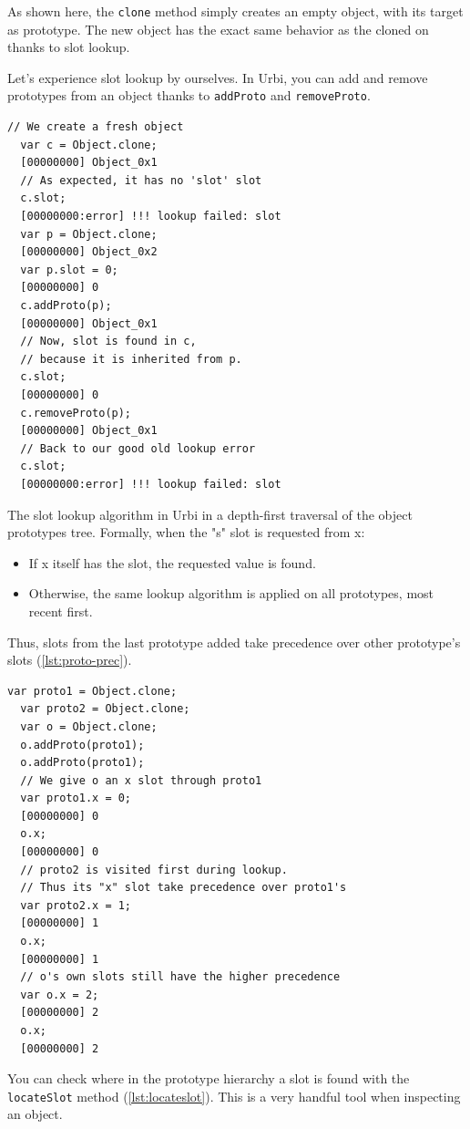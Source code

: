 \documentclass[openright,twoside,12pt]{report}
\newcommand{\urbi}{Urbi\xspace}
\newcommand{\lst}[1]{\autoref{lst:#1}}
\begin{document}
As shown here, the \texttt{clone} method simply creates an empty
object, with its target as prototype. The new object has the exact
same behavior as the cloned on thanks to slot lookup.

Let's experience slot lookup by ourselves. In \urbi, you can add and
remove prototypes from an object thanks to \texttt{addProto} and
\texttt{removeProto}.

\begin{lstlisting}[caption=Manipulating prototypes, label=lst:proto-change]
  // We create a fresh object
  var c = Object.clone;
  [00000000] Object_0x1
  // As expected, it has no 'slot' slot
  c.slot;
  [00000000:error] !!! lookup failed: slot
  var p = Object.clone;
  [00000000] Object_0x2
  var p.slot = 0;
  [00000000] 0
  c.addProto(p);
  [00000000] Object_0x1
  // Now, slot is found in c,
  // because it is inherited from p.
  c.slot;
  [00000000] 0
  c.removeProto(p);
  [00000000] Object_0x1
  // Back to our good old lookup error
  c.slot;
  [00000000:error] !!! lookup failed: slot
\end{lstlisting}

The slot lookup algorithm in \urbi in a depth-first traversal of the
object prototypes tree. Formally, when the "s" slot is requested from
x:

\begin{itemize}
\item If x itself has the slot, the requested value is found.
\item Otherwise, the same lookup algorithm is applied on all
  prototypes, most recent first.
\end{itemize}

Thus, slots from the last prototype added take precedence over other
prototype's slots (\lst{proto-prec}).

\begin{lstlisting}[caption=Prototype precedence, label=lst:proto-prec]
  var proto1 = Object.clone;
  var proto2 = Object.clone;
  var o = Object.clone;
  o.addProto(proto1);
  o.addProto(proto1);
  // We give o an x slot through proto1
  var proto1.x = 0;
  [00000000] 0
  o.x;
  [00000000] 0
  // proto2 is visited first during lookup.
  // Thus its "x" slot take precedence over proto1's
  var proto2.x = 1;
  [00000000] 1
  o.x;
  [00000000] 1
  // o's own slots still have the higher precedence
  var o.x = 2;
  [00000000] 2
  o.x;
  [00000000] 2
\end{lstlisting}

You can check where in the prototype hierarchy a slot is found with
the \texttt{locateSlot} method (\lst{locateslot}). This is a very
handful tool when inspecting an object.
\end{document}
